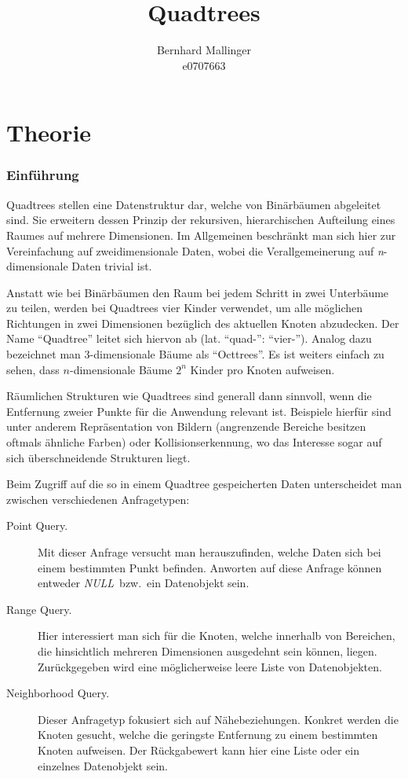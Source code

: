 \documentclass[%
			paper=a4,%
			DIV12, %
			draft=false,%
			titlepage
			]{scrartcl}
\title{Quadtrees}
\author{Bernhard Mallinger \\ e0707663}
\newcommand{\mynull}{\textit{NULL}}
\begin{document}
\maketitle

\tableofcontents 

\newpage

%

\part{Theorie}
\section{Einführung}
Quadtrees stellen eine Datenstruktur dar, welche von Binärbäumen abgeleitet sind. Sie erweitern dessen Prinzip der rekursiven, hierarchischen Aufteilung eines Raumes auf mehrere Dimensionen. 
Im Allgemeinen beschränkt man sich hier zur Vereinfachung auf zweidimensionale Daten, wobei die Verallgemeinerung auf \textit{n}-dimensionale Daten trivial ist.

Anstatt wie bei Binärbäumen den Raum bei jedem Schritt in zwei Unterbäume zu teilen, werden bei Quadtrees vier Kinder verwendet, um alle möglichen Richtungen in zwei Dimensionen bezüglich des aktuellen Knoten abzudecken. Der Name "`Quadtree"' leitet sich hiervon ab (lat. "`quad-"': "`vier-"'). 
Analog dazu bezeichnet man 3-dimensionale Bäume als "`Octtrees"'. Es ist weiters einfach zu sehen, dass $n$-dimensionale Bäume $2^n$ Kinder pro Knoten aufweisen.

Räumlichen Strukturen wie Quadtrees sind generall dann sinnvoll, wenn die Entfernung zweier Punkte für die Anwendung relevant ist. Beispiele hierfür sind unter anderem Repräsentation von Bildern (angrenzende Bereiche besitzen oftmals ähnliche Farben) oder Kollisionserkennung, wo das Interesse sogar auf sich überschneidende Strukturen liegt.

Beim Zugriff auf die so in einem Quadtree gespeicherten Daten unterscheidet man zwischen verschiedenen Anfragetypen:
\begin{description}
	\item[Point Query.] Mit dieser Anfrage versucht man herauszufinden, welche Daten sich bei einem bestimmten Punkt befinden. Anworten auf diese Anfrage können entweder \mynull\ bzw.\ ein Datenobjekt sein.
	\item[Range Query.] Hier interessiert man sich für die Knoten, welche innerhalb von Bereichen, die hinsichtlich mehreren Dimensionen ausgedehnt sein können, liegen. Zurückgegeben wird eine möglicherweise leere Liste von Datenobjekten.
	\item[Neighborhood Query.] Dieser Anfragetyp fokusiert sich auf Nähebeziehungen. Konkret werden die Knoten gesucht, welche die geringste Entfernung zu einem bestimmten Knoten aufweisen. Der Rückgabewert kann hier eine Liste oder ein einzelnes Datenobjekt sein.
\end{description}
\end{document}

